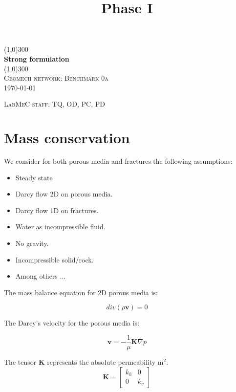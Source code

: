 \documentclass{article}
\title{Phase I}
\begin{document}
\begin{titlepage}
	\begin{center}
    \line(1,0){300}\\
    [0.65cm]
	\huge{\bfseries Strong formulation}\\
	\line(1,0){300}\\
	\textsc{\Large Geomech network: Benchmark 0a}\\
	\textsc{\LARGE \today}\\
	[5.5cm]     
	\end{center}
	\begin{flushright}
		\textsc{\Large LabMeC staff: TQ, OD, PC, PD}\\
		[0.5cm]
	\end{flushright}
\end{titlepage}

\section{Mass conservation}

We consider for both porous media and fractures the following assumptions:

\begin{itemize}
\item Steady state
\item Darcy flow 2D on porous media.
\item Darcy flow 1D on fractures.
\item Water as incompressible fluid.
\item No gravity.
\item Incompressible solid/rock.
\item Among others ...
\end{itemize}


The mass balance equation for 2D porous media is:

\begin{equation}
div\left(\rho\mathbf{v}\right)=0
\end{equation}

The Darcy's velocity for the porous media is:

\begin{equation}
\mathbf{v}=-\frac{1}{\mu}\mathbf{K}\nabla p
\end{equation}

The tensor $\mathbf{K}$ represents the absolute permeability $\si{\square\metre}$.
\begin{equation}
\mathbf{K}=\left[\begin{array}{cc}
k_{h} & 0\\
0 & k_{v}
\end{array}\right]
\end{equation}
\end{document}
